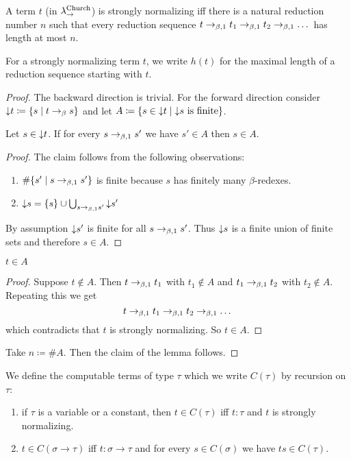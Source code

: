 \begin{boxlem}
    A term $t$ (in $\lambda_{\to}^{\textnormal{Church}}$) is strongly normalizing iff there is a natural reduction number $n$ such that every reduction sequence $t \to_{\beta, 1} t_1 \to_{\beta, 1} t_2 \to_{\beta, 1} \dots$ has length at most $n$.
\end{boxlem}
For a strongly normalizing term $t$, we write $h(t)$ for the maximal length of a reduction sequence starting with $t$.
\begin{proof}
    The backward direction is trivial.
    For the forward direction consider ${\downarrow} t \coloneq \{s \mid t \to_{\beta} s\}$ and let $A \coloneq \{ s \in {\downarrow} t \mid {\downarrow} s \text{ is finite}\}$.
    \begin{claim}
        Let $s \in {\downarrow} t$.
        If for every $s \to_{\beta, 1} s'$ we have $s' \in A$ then $s \in A$.
        \begin{proof}
            The claim follows from the following observations:
            \begin{enumerate}
                \item $\#\{s' \mid s \to_{\beta, 1} s'\}$ is finite because $s$ has finitely many $\beta$-redexes.
                \item ${\downarrow} s = \{s\} \cup \bigcup_{s \to_{\beta, 1} s'} {\downarrow} s'$
            \end{enumerate}
            By assumption ${\downarrow} s'$ is finite for all $s \to_{\beta, 1} s'$.
            Thus ${\downarrow} s$ is a finite union of finite sets and therefore $s \in A$.
        \end{proof}
    \end{claim}
    \begin{claim}
        $t \in A$
        \begin{proof}
            Suppose $t \notin A$.
            Then $t \to_{\beta, 1} t_1$ with $t_1 \notin A$ and $t_1 \to_{\beta, 1} t_2$ with $t_2 \notin A$.
            Repeating this we get
            \begin{equation*}
                t \to_{\beta, 1} t_1 \to_{\beta, 1} t_2 \to_{\beta, 1} \dots
            \end{equation*}
            which contradicts that $t$ is strongly normalizing.
            So $t \in A$.
        \end{proof}
    \end{claim}
    Take $n \coloneq \# A$.
    Then the claim of the lemma follows.
\end{proof}

\begin{boxdefi}
    We define the \alert{computable} terms of type $\tau$ which we write \alert{$C(\tau)$} by recursion on $\tau$:
    \begin{enumerate}
        \item if $\tau$ is a variable or a constant, then $t \in C(\tau)$ iff $t : \tau$ and $t$ is strongly normalizing.
        \item $t \in C(\sigma \to \tau)$ iff $t : \sigma \to \tau$ and for every $s \in C(\sigma)$ we have $ts \in C(\tau)$.
    \end{enumerate}
\end{boxdefi}

